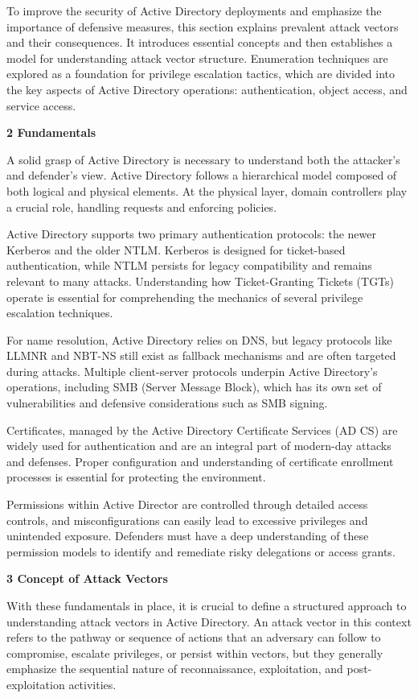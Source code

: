 To improve the security of Active Directory deployments and emphasize the importance of defensive measures, this section explains prevalent attack vectors and their consequences. It introduces essential concepts and then establishes a model for understanding attack vector structure. Enumeration techniques are explored as a foundation for privilege escalation tactics, which are divided into the key aspects of Active Directory operations: authentication, object access, and service access.

\textbf{2 Fundamentals}

A solid grasp of Active Directory is necessary to understand both the attacker’s and defender’s view. Active Directory follows a hierarchical model composed of both logical and physical elements. At the physical layer, domain controllers play a crucial role, handling requests and enforcing policies.

Active Directory supports two primary authentication protocols: the newer Kerberos and the older NTLM. Kerberos is designed for ticket-based authentication, while NTLM persists for legacy compatibility and remains relevant to many attacks. Understanding how Ticket-Granting Tickets (TGTs) operate is essential for comprehending the mechanics of several privilege escalation techniques.

For name resolution, Active Directory relies on DNS, but legacy protocols like LLMNR and NBT-NS still exist as fallback mechanisms and are often targeted during attacks. Multiple client-server protocols underpin Active Directory’s operations, including SMB (Server Message Block), which has its own set of vulnerabilities and defensive considerations such as SMB signing. 

Certificates, managed by the Active Directory Certificate Services (AD CS) are widely used for authentication and are an integral part of modern-day attacks and defenses. Proper configuration and understanding of certificate enrollment processes is essential for protecting the environment.

Permissions within Active Director are controlled through detailed access controls, and misconfigurations can easily lead to excessive privileges and unintended exposure. Defenders must have a deep understanding of these permission models to identify and remediate risky delegations or access grants.

\textbf{3 Concept of Attack Vectors}

With these fundamentals in place, it is crucial to define a structured approach to understanding attack vectors in Active Directory. An attack vector in this context refers to the pathway or sequence of actions that an adversary can follow to compromise, escalate privileges, or persist within vectors, but they generally emphasize the sequential nature of reconnaissance, exploitation, and post-exploitation activities.

